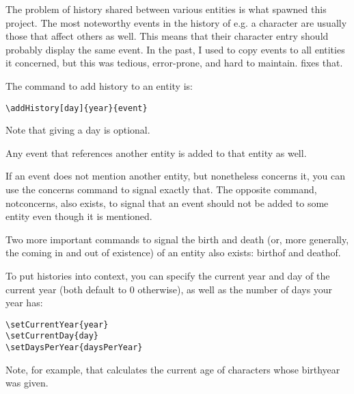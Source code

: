 \documentclass[openany]{book}
\begin{document}
The problem of history shared between various entities is what spawned this project. The most noteworthy events in the history of e.g. a character are usually those that affect others as well. This means that their character entry should probably display the same event. In the past, I used to copy events to all entities it concerned, but this was tedious, error-prone, and hard to maintain. \LoreTex{} fixes that.

The command to add history to an entity is:
\begin{verbatim}
\addHistory[day]{year}{event}
\end{verbatim}
Note that giving a day is optional.



Any event that references another entity is added to that entity as well.


If an event does not mention another entity, but nonetheless concerns it, you can use the concerns command to signal exactly that. The opposite command, notconcerns, also exists, to signal that an event should not be added to some entity even though it is mentioned.


Two more important commands to signal the birth and death (or, more generally, the coming in and out of existence) of an entity also exists: birthof and deathof.



To put histories into context, you can specify the current year and day of the current year (both default to 0 otherwise), as well as the number of days your year has:
\begin{verbatim}
\setCurrentYear{year}
\setCurrentDay{day}
\setDaysPerYear{daysPerYear}
\end{verbatim}
Note, for example, that \LoreTex{} calculates the current age of characters whose birthyear was given.







\automatedChapters{}
\end{document}
